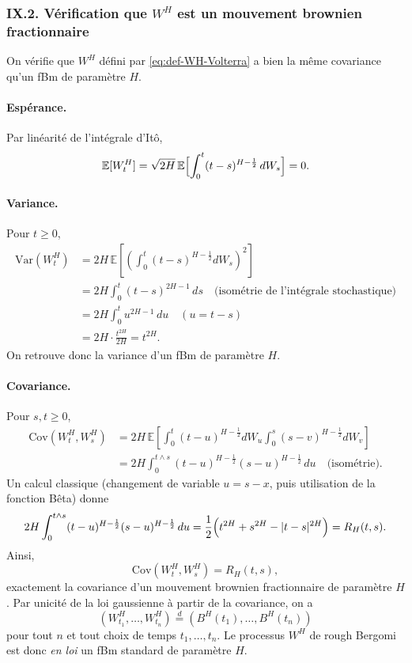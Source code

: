 \documentclass[11pt,a4paper]{article}
\newcommand{\E}{\mathbb{E}}
\newcommand{\Var}{\mathrm{Var}}
\newcommand{\Cov}{\mathrm{Cov}}
\newcommand{\1}{\mathbf{1}}
\newcommand{\bH}{B^{H}}
\begin{document}
\subsubsection*{IX.2. Vérification que $W^H$ est un mouvement brownien fractionnaire}

On vérifie que $W^H$ défini par \eqref{eq:def-WH-Volterra} a bien
la même covariance qu'un fBm de paramètre $H$.

\paragraph{Espérance.}
Par linéarité de l'intégrale d'Itô,
\begin{equation}
  \E[W_t^H]
  = \sqrt{2H}\,\E\Bigl[\int_0^t (t-s)^{H-\frac12}\,dW_s\Bigr]
  = 0.
\end{equation}

\paragraph{Variance.}
Pour $t\ge 0$,
\begin{align}
  \Var(W_t^H)
  &= 2H\,\E\left[\left(
        \int_0^t (t-s)^{H-\frac12} dW_s
      \right)^2\right] \\
  &= 2H \int_0^t (t-s)^{2H-1}\,ds
     \quad\text{(isométrie de l'intégrale stochastique)}  \\[0.3em]
  &= 2H \int_0^t u^{2H-1}\,du
     \quad (u = t-s) \\[0.3em]
  &= 2H \cdot \frac{t^{2H}}{2H}
   = t^{2H}.
\end{align}
On retrouve donc la variance d'un fBm de paramètre $H$.

\paragraph{Covariance.}
Pour $s,t\ge 0$,
\begin{align}
  \Cov(W_t^H,W_s^H)
  &= 2H\,\E\left[
      \int_0^t (t-u)^{H-\frac12} dW_u
      \int_0^s (s-v)^{H-\frac12} dW_v
    \right] \\[0.3em]
  &= 2H \int_0^{t\wedge s}
          (t-u)^{H-\frac12}(s-u)^{H-\frac12}\,du
     \quad\text{(isométrie)}.
\end{align}
Un calcul classique (changement de variable $u=s-x$, puis utilisation
de la fonction Bêta) donne
\begin{equation}
  2H \int_0^{t\wedge s}
          (t-u)^{H-\frac12}(s-u)^{H-\frac12}\,du
  = \frac{1}{2}\Bigl(t^{2H}+s^{2H}-|t-s|^{2H}\Bigr)
  = R_H(t,s).
\end{equation}
Ainsi,
\begin{equation}
  \Cov(W_t^H,W_s^H) = R_H(t,s),
\end{equation}
exactement la covariance d'un mouvement brownien fractionnaire de
paramètre $H$. Par unicité de la loi gaussienne à partir de la
covariance, on a
\begin{equation}
  (W_{t_1}^H,\dots,W_{t_n}^H)
  \stackrel{d}{=}
  (\bH(t_1),\dots,\bH(t_n))
\end{equation}
pour tout $n$ et tout choix de temps $t_1,\dots,t_n$. Le processus
$W^H$ de rough Bergomi est donc \emph{en loi} un fBm standard de
paramètre $H$.
\end{document}
